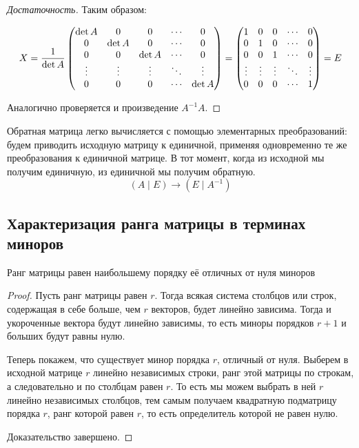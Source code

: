 \begin{proof}[Достаточность]
	Таким образом:

	$$
	X=\frac1{\det A}
	\begin{pmatrix}
	\det A & 0      & 0      & \cdots & 0      \\
	0      & \det A & 0      & \cdots & 0      \\
	0      & 0      & \det A & \cdots & 0      \\
	\vdots & \vdots & \vdots & \ddots & \vdots \\
	0      & 0      & 0      & \cdots & \det A
	\end{pmatrix}=
	\begin{pmatrix}
	1      & 0      & 0      & \cdots & 0      \\
	0      & 1      & 0      & \cdots & 0      \\
	0      & 0      & 1      & \cdots & 0      \\
	\vdots & \vdots & \vdots & \ddots & \vdots \\
	0      & 0      & 0      & \cdots & 1
	\end{pmatrix}=
	E
	$$

	Аналогично проверяется и произведение $A^{-1}A$.
\end{proof}

Обратная матрица легко вычисляется с помощью элементарных преобразований: будем приводить исходную матрицу к единичной, применяя одновременно те же преобразования к единичной матрице. В тот момент, когда из исходной мы получим единичную, из единичной мы получим обратную.
 $$\left(A\mid E \right) \longrightarrow \left(E\mid A^{-1} \right)$$
 
\newpage
\subsection{Характеризация ранга матрицы в терминах миноров}

\begin{theorem}
  Ранг матрицы равен наибольшему порядку её отличных от нуля миноров
\end{theorem}
\begin{proof}
  Пусть ранг матрицы равен $r$. Тогда всякая система столбцов или строк, содержащая в себе больше, чем $r$ векторов, будет линейно зависима. Тогда и укороченные вектора будут линейно зависимы, то есть миноры порядков $r+1$ и больших будут равны нулю.

  Теперь покажем, что существует минор порядка $r$, отличный от нуля. Выберем в исходной матрице $r$ линейно независимых строки, ранг этой матрицы по строкам, а следовательно и по столбцам равен $r$. То есть мы можем выбрать в ней $r$ линейно независимых столбцов, тем самым получаем квадратную подматрицу порядка $r$, ранг которой равен $r$, то есть определитель которой не равен нулю.
  
  Доказательство завершено.
\end{proof}
